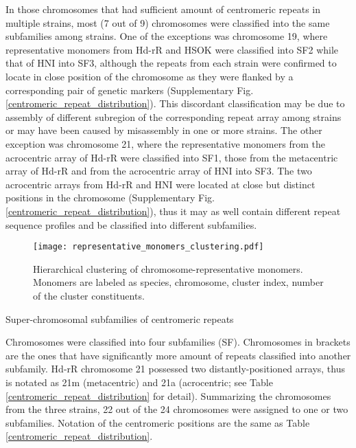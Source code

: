   In those chromosomes that had sufficient amount of centromeric repeats in multiple strains, most (7 out of 9) chromosomes were classified into the same subfamilies among strains. One of the exceptions was chromosome 19, where representative monomers from Hd-rR and HSOK were classified into SF2 while that of HNI into SF3, although the repeats from each strain were confirmed to locate in close position of the chromosome as they were flanked by a corresponding pair of genetic markers (Supplementary Fig. \ref{centromeric_repeat_distribution}). This discordant classification may be due to assembly of different subregion of the corresponding repeat array among strains or may have been caused by misassembly in one or more strains. The other exception was chromosome 21, where the representative monomers from the acrocentric array of Hd-rR were classified into SF1, those from the metacentric array of Hd-rR and from the acrocentric array of HNI into SF3. The two acrocentric arrays from Hd-rR and HNI were located at close but distinct positions in the chromosome (Supplementary Fig. \ref{centromeric_repeat_distribution}), thus it may as well contain different repeat sequence profiles and be classified into different subfamilies.

  \begin{figure*}
    \centering
    \texttt{[image: representative\_monomers\_clustering.pdf]}
    \caption{
      Hierarchical clustering of chromosome-representative monomers. Monomers are labeled as species, chromosome, cluster index, number of the cluster constituents.
    }
    \label{monomer_clustering}
  \end{figure*}

  \begin{table*}
    \centering
    \caption{Super-chromosomal subfamilies of centromeric repeats}
    
    \label{super_chromosomal_subfamily}
    \caption*{{\small
      Chromosomes were classified into four subfamilies (SF). Chromosomes in brackets are the ones that have significantly more amount of repeats classified into another subfamily. Hd-rR chromosome 21 possessed two distantly-positioned arrays, thus is notated as 21m (metacentric) and 21a (acrocentric; see Table \ref{centromeric_repeat_distribution} for detail). Summarizing the chromosomes from the three strains, 22 out of the 24 chromosomes were assigned to one or two subfamilies. Notation of the centromeric positions are the same as Table \ref{centromeric_repeat_distribution}.
    }}
  \end{table*}
